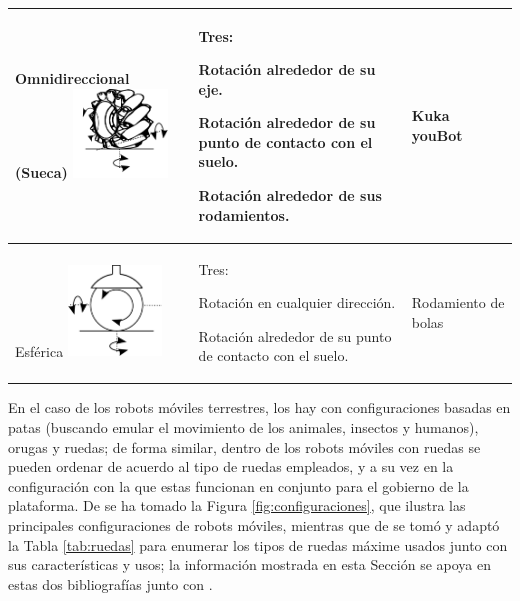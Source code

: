 \begin{table}[htbp!]
\begin{center}
\begin{tabular}{|p{3cm}|p{7cm}|p{4cm}|}
			Omnidireccional (Sueca) \includegraphics[width=2.5cm]{./Figuras/Sueca.png} & Tres:
			\begin{compactitem}
				\item Rotación alrededor de su eje.
				\item Rotación alrededor de su punto de contacto con el suelo.
				\item Rotación alrededor de sus  rodamientos.
			\end{compactitem} & Kuka youBot\\
			\hline
			Esférica \includegraphics[width=2.5cm]{./Figuras/REsfera.png} & Tres:
			\begin{compactitem}
				\item Rotación en cualquier dirección.
				\item Rotación alrededor de su punto de contacto con el suelo.
			\end{compactitem} & Rodamiento de bolas\\
			\hline
		\end{tabular}
	\end{center}
\end{table}
\vspace*{-0.6cm}
\par En el caso de los robots móviles terrestres, los hay con configuraciones basadas en patas (buscando emular el movimiento de los animales, insectos y humanos), orugas y ruedas; de forma similar, dentro de los robots móviles con ruedas se pueden ordenar de acuerdo al tipo de ruedas empleados, y a su vez en la configuración con la que estas funcionan en conjunto para el gobierno de la plataforma. De \cite{barrientossotelovictorricardoRobotsMovilesEvolucion} se ha tomado la Figura \ref{fig:configuraciones}, que ilustra las principales configuraciones de robots móviles, mientras que de \cite{corellnikolausIntroductionAutonomousRobots2014} se tomó y adaptó la Tabla \ref{tab:ruedas} para enumerar los tipos de ruedas máxime usados junto con sus características y usos; la información mostrada en esta Sección se apoya en estas dos bibliografías junto con \cite{fernandoRoboticaControlRobots2011}.
